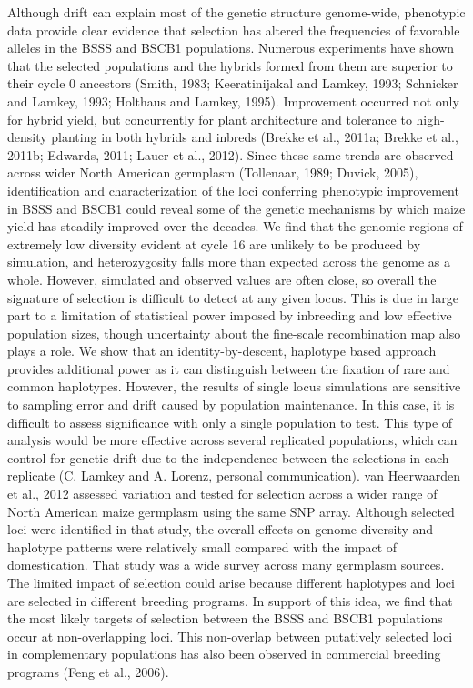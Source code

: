 	Although drift can explain most of the genetic structure genome-wide, phenotypic data provide clear evidence that selection has altered the frequencies of favorable alleles in the BSSS and BSCB1 populations. Numerous experiments have shown that the selected populations and the hybrids formed from them are superior to their cycle 0 ancestors (Smith, 1983; Keeratinijakal and Lamkey, 1993; Schnicker and Lamkey, 1993; Holthaus and Lamkey, 1995). Improvement occurred not only for hybrid yield, but concurrently for plant architecture and tolerance to high-density planting in both hybrids and inbreds (Brekke et al., 2011a; Brekke et al., 2011b; Edwards, 2011; Lauer et al., 2012). Since these same trends are observed across wider North American germplasm (Tollenaar, 1989; Duvick, 2005), identification and characterization of the loci conferring phenotypic improvement in BSSS and BSCB1 could reveal some of the genetic mechanisms by which maize yield has steadily improved over the decades. We find that the genomic regions of extremely low diversity evident at cycle 16 are unlikely to be produced by simulation, and heterozygosity falls more than expected across the genome as a whole.  However, simulated and observed values are often close, so overall the signature of selection is difficult to detect at any given locus. This is due in large part to a limitation of statistical power imposed by inbreeding and low effective population sizes, though uncertainty about the fine-scale recombination map also plays a role. We show that an identity-by-descent, haplotype based approach provides additional power as it can distinguish between the fixation of rare and common haplotypes. However, the results of single locus simulations are sensitive to sampling error and drift caused by population maintenance. In this case, it is difficult to assess significance with only a single population to test. This type of analysis would be more effective across several replicated populations, which can control for genetic drift due to the independence between the selections in each replicate (C. Lamkey and A. Lorenz, personal communication). 
	van Heerwaarden et al., 2012 assessed variation and tested for selection across a wider range of North American maize germplasm using the same SNP array. Although selected loci were identified in that study, the overall effects on genome diversity and haplotype patterns were relatively small compared with the impact of domestication. That study was a wide survey across many germplasm sources. The limited impact of selection could arise because different haplotypes and loci are selected in different breeding programs. In support of this idea, we find that the most likely targets of selection between the BSSS and BSCB1 populations occur at non-overlapping loci. This non-overlap between putatively selected loci in complementary populations has also been observed in commercial breeding programs (Feng et al., 2006).

